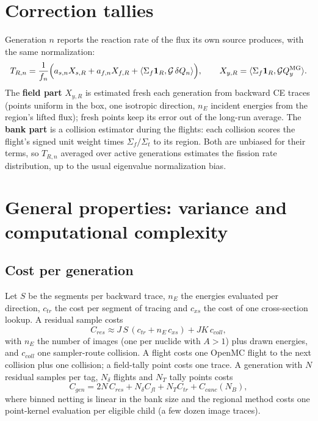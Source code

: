 \section{Correction tallies}\label{sec:tallies}

Generation $n$ reports the reaction rate of the flux its own source produces, with the same
normalization:
\begin{equation}
T_{R,n}=\frac{1}{f_n}\Big(a_{s,n}X_{s,R}+a_{f,n}X_{f,R}+\langle\Sigma_f\mathbf 1_R,\mathcal G\,\delta Q_n\rangle\Big),
\qquad X_{y,R}=\langle\Sigma_f\mathbf 1_R,\mathcal GQ^{\mathrm{MG}}_y\rangle .
\end{equation}
The \textbf{field part} $X_{y,R}$ is estimated fresh each generation from backward CE traces (points
uniform in the box, one isotropic direction, $n_E$ incident energies from the region's lifted flux);
fresh points keep its error out of the long-run average. The \textbf{bank part} is a collision
estimator during the flights: each collision scores the flight's signed unit weight times
$\Sigma_f/\Sigma_t$ to its region. Both are unbiased for their terms, so $T_{R,n}$ averaged over active
generations estimates the fission rate distribution, up to the usual eigenvalue normalization bias.

\section{General properties: variance and computational complexity}\label{sec:properties}

\subsection{Cost per generation}

Let $S$ be the segments per backward trace, $n_E$ the energies evaluated per direction, $c_{tr}$ the
cost per segment of tracing and $c_{xs}$ the cost of one cross-section lookup. A residual sample
costs
\begin{equation}
C_{res}\approx J\,S\,(c_{tr}+n_E\,c_{xs})+JK\,c_{coll},
\end{equation}
with $n_E$ the number of images (one per nuclide with $A>1$) plus drawn energies, and $c_{coll}$ one
sampler-route collision. A flight costs one OpenMC flight to the next collision plus one collision; a
field-tally point costs one trace. A generation with $N$ residual samples per tag, $N_\delta$ flights
and $N_T$ tally points costs
\begin{equation}
C_{gen}=2N\,C_{res}+N_\delta C_{fl}+N_TC_{tr}+C_{canc}(N_B),
\end{equation}
where binned netting is linear in the bank size and the regional method costs one point-kernel
evaluation per eligible child (a few dozen image traces).

